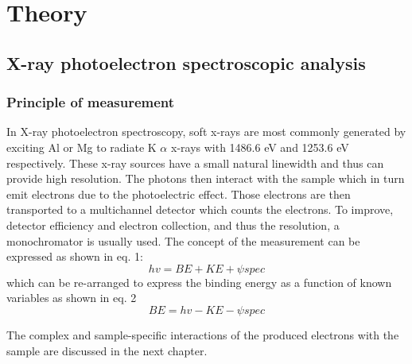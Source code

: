 

\chapter{Theory}

\label{Chapter2} %



\section{X-ray photoelectron spectroscopic analysis}

\subsection{Principle of measurement}


In X-ray photoelectron spectroscopy, soft x-rays are most commonly generated by exciting Al or Mg to radiate K \(\alpha\) x-rays with 1486.6 eV and 1253.6 eV respectively. These x-ray sources have a small natural linewidth and thus can provide high resolution. The photons then interact with the sample which in turn emit electrons due to the photoelectric effect. Those electrons are then transported to a multichannel detector which counts the electrons. To improve, detector efficiency and electron collection, and thus the resolution, a monochromator is usually used.\cite{stevie_introduction_2020} The concept of the measurement can be expressed as shown in eq. 1:
\begin{equation}
    hv = BE + KE + \psi spec
\end{equation}
which can be re-arranged to express the binding energy as a function of known variables \cite{stevie_introduction_2020} as shown in eq. 2
\begin{equation}
    BE = hv- KE - \psi spec
\end{equation}

The complex and sample-specific interactions of the produced electrons with the sample are discussed in the next chapter.
 
